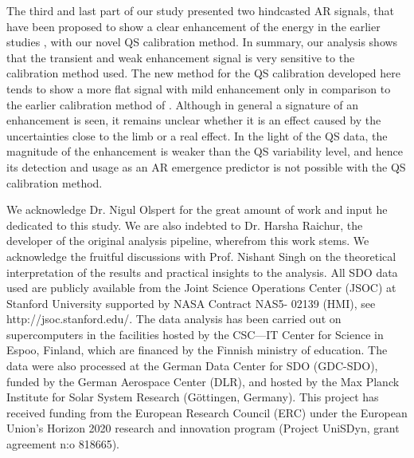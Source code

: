 \documentclass{aa}
\begin{document}
The third and last part of our study presented two hindcasted 
AR \fff signals, that have been proposed to show a clear enhancement of the \fff energy in the earlier studies \citep[][]{SRB16,Waidele22}, with our novel QS calibration method. In summary, our analysis shows that the transient
and weak enhancement signal is very sensitive to the calibration
method used. The new method for the QS calibration developed here tends to show a more flat signal with mild enhancement only in comparison to the earlier calibration method of \cite{SRB16}. Although in general a signature of an enhancement is seen, it remains unclear whether it is an effect caused by the uncertainties close to the limb or a real effect. In the light of the QS data, the magnitude of the enhancement is weaker than the QS variability level, and hence its detection and usage as an AR emergence predictor is not possible with the QS calibration method.

\begin{acknowledgements}
We acknowledge Dr. Nigul Olspert for the great amount of work and input he dedicated to this study. We are also indebted to Dr. Harsha Raichur, the developer of the original \fff analysis pipeline, wherefrom this work stems. We acknowledge the fruitful discussions with Prof. Nishant Singh on the theoretical interpretation of the results and practical insights to the analysis.
All SDO data used are publicly available from the Joint Science Operations Center (JSOC) at Stanford University supported by NASA Contract NAS5- 02139 (HMI), see http://jsoc.stanford.edu/. 
The data analysis has been carried out on supercomputers in the facilities hosted by the CSC---IT
Center for Science in Espoo, Finland, which are financed by the
Finnish ministry of education.
The data were also
processed at the German Data Center for SDO (GDC-SDO), funded by the
German Aerospace Center (DLR), and hosted by the Max Planck Institute for Solar System Research (Göttingen, Germany).
This project has received funding from the European Research Council (ERC)
under the European Union's Horizon 2020 research and innovation
program (Project UniSDyn, grant agreement n:o 818665).

\end{acknowledgements}

{}

\end{document}
